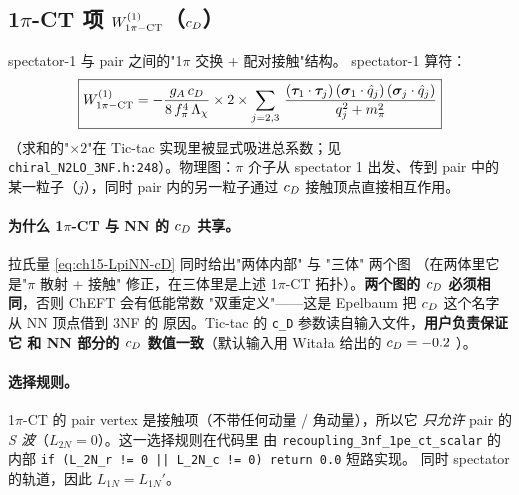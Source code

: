 \subsection{1\(\pi\)-CT 项 \(W^{(1)}_{1\pi-{\rm CT}}\)（\(c_D\)）}
\label{subsec:ch15-1pe-ct}

spectator-1 与 pair 之间的"1\(\pi\) 交换 + 配对接触"结构。
spectator-1 算符：
\begin{equation}
\label{eq:ch15-W1pe-ct-op}
\boxed{
W^{(1)}_{1\pi-{\rm CT}}
= -\frac{g_A\, c_D}{8\, f_\pi^4\, \Lambda_\chi} \times 2 \times
\sum_{j=2,3}\,
\frac{(\bm{\tau}_1 \cdot \bm{\tau}_j)\,(\bm{\sigma}_1 \cdot \hat{q}_j)\,(\bm{\sigma}_j \cdot \hat{q}_j)}
     {q_j^2 + m_\pi^2}
}
\end{equation}
（求和的"\(\times 2\)"在 Tic-tac 实现里被显式吸进总系数；见
\texttt{chiral\_N2LO\_3NF.h:248}）。物理图：\(\pi\) 介子从 spectator 1
出发、传到 pair 中的某一粒子（\(j\)），同时 pair 内的另一粒子通过 \(c_D\)
接触顶点直接相互作用。

\paragraph{为什么 1\(\pi\)-CT 与 NN 的 \(c_D\) 共享。}
拉氏量 \cref{eq:ch15-LpiNN-cD} 同时给出"两体内部" 与 "三体" 两个图
（在两体里它是"\(\pi\) 散射 + 接触" 修正，在三体里是上述 1\(\pi\)-CT
拓扑）。\textbf{两个图的 \(c_D\) 必须相同}，否则 ChEFT 会有低能常数
"双重定义"——这是 Epelbaum 把 \(c_D\) 这个名字从 NN 顶点借到 3NF 的
原因。Tic-tac 的 \texttt{c\_D} 参数读自输入文件，\textbf{用户负责保证它
和 NN 部分的 \(c_D\) 数值一致}（默认输入用 Witała 给出的 \(c_D = -0.2\)
\cite{Epelbaum2002NLO3NF}）。

\paragraph{选择规则。}
1\(\pi\)-CT 的 pair vertex 是接触项（不带任何动量 / 角动量），所以它
\emph{只允许} pair 的 \emph{S 波}（\(L_{2N} = 0\)）。这一选择规则在代码里
由 \texttt{recoupling\_3nf\_1pe\_ct\_scalar} 的内部
\texttt{if (L\_2N\_r != 0 || L\_2N\_c != 0) return 0.0} 短路实现。
同时 spectator 的轨道，因此 \(L_{1N} = L_{1N}'\)。

